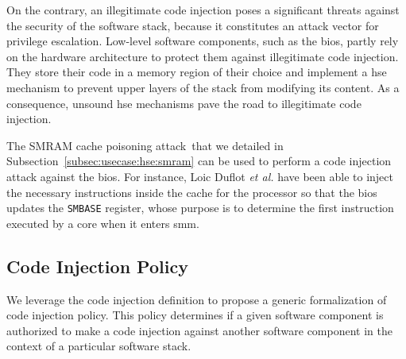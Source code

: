 On the contrary, an illegitimate code injection poses a significant threats
against the security of the software stack, because it constitutes an attack vector for privilege escalation.
%
Low-level software components, such as the \ac{bios}, partly rely on the
hardware architecture to protect them against illegitimate code injection.
%
They store their code in a memory region of their choice and implement a
\ac{hse} mechanism to prevent upper layers of the stack from modifying its
content.
%
As a consequence, unsound \ac{hse} mechanisms pave the road to illegitimate code
injection.

\begin{example}
  The SMRAM cache poisoning attack\,\cite{duflot2009smram,wojtczuk2009smram}
  that we detailed in Subsection~\ref{subsec:usecase:hse:smram} can be used to
  perform a code injection attack against the \ac{bios}.
  For instance, Loic Duflot \emph{et al.} have been able to inject the necessary
  instructions inside the cache for the processor so that the \ac{bios} updates
  the \texttt{SMBASE} register, whose purpose is to determine the first
  instruction executed by a core when it enters \ac{smm}.
\end{example}

\subsection{Code Injection Policy}
\label{subsec:speccert:globalsec}

We leverage the code injection definition to propose a generic formalization of
code injection policy. This policy determines if a given software component is authorized
to make a code injection against another software component in the context of a
particular software stack. 


